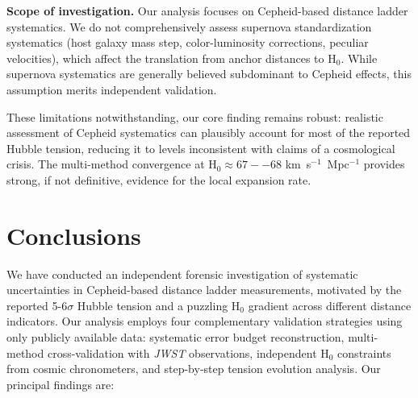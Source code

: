\documentclass[preprint, linenumbers]{aastex701}
\begin{document}
\textbf{Scope of investigation.} Our analysis focuses on Cepheid-based distance ladder systematics. We do not comprehensively assess supernova standardization systematics (host galaxy mass step, color-luminosity corrections, peculiar velocities), which affect the translation from anchor distances to H$_0$. While supernova systematics are generally believed subdominant to Cepheid effects, this assumption merits independent validation.

These limitations notwithstanding, our core finding remains robust: realistic assessment of Cepheid systematics can plausibly account for most of the reported Hubble tension, reducing it to levels inconsistent with claims of a cosmological crisis. The multi-method convergence at H$_0 \approx 67--68$ km~s$^{-1}$~Mpc$^{-1}$ provides strong, if not definitive, evidence for the local expansion rate.


\section{Conclusions} \label{sec:conclusions}

We have conducted an independent forensic investigation of systematic uncertainties in Cepheid-based distance ladder measurements, motivated by the reported 5-6$\sigma$ Hubble tension and a puzzling H$_0$ gradient across different distance indicators. Our analysis employs four complementary validation strategies using only publicly available data: systematic error budget reconstruction, multi-method cross-validation with \textit{JWST} observations, independent H$_0$ constraints from cosmic chronometers, and step-by-step tension evolution analysis. Our principal findings are:
\end{document}
